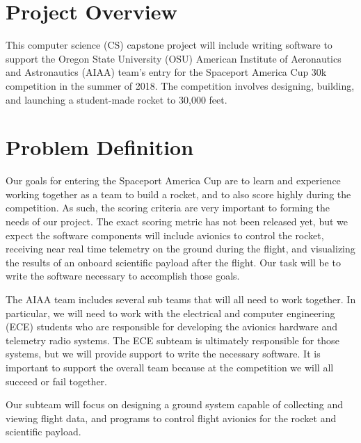 \documentclass[onecolumn, draftclsnofoot, 10pt, compsoc]{IEEEtran}
\begin{document}

\tableofcontents

\newpage
\section{Project Overview}
This computer science (CS) capstone project will include writing software to support the Oregon State University (OSU) American Institute of Aeronautics and Astronautics (AIAA) team's entry for the Spaceport America Cup 30k competition in the summer of 2018.  The competition involves designing, building, and launching a student-made rocket to 30,000 feet.


\section{Problem Definition}
Our goals for entering the Spaceport America Cup are to learn and experience working together as a team to build a rocket, and to also score highly during the competition.  As such, the scoring criteria are very important to forming the needs of our project.  The exact scoring metric has not been released yet, but we expect the software components will include avionics to control the rocket, receiving near real time telemetry on the ground during the flight, and visualizing the results of an onboard scientific payload after the flight.  Our task will be to write the software necessary to accomplish those goals.

The AIAA team includes several sub teams that will all need to work together.  In particular, we will need to work with the electrical and computer engineering (ECE) students who are responsible for developing the avionics hardware and telemetry radio systems.  The ECE subteam is ultimately responsible for those systems, but we will provide support to write the necessary software.  It is important to support the overall team because at the competition we will all succeed or fail together.

Our subteam will focus on designing a ground system capable of collecting and viewing flight data, and programs to control flight avionics for the rocket and scientific payload.
\end{document}

